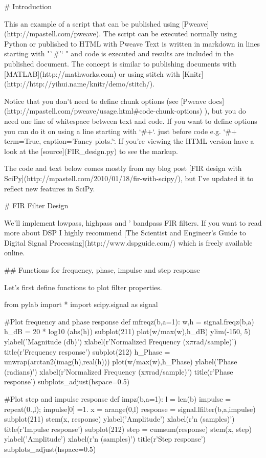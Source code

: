 
# Introduction

This an example of a script that can be published using
[Pweave](http://mpastell.com/pweave). The script can be executed
normally using Python or published to HTML with Pweave
Text is written in markdown in lines starting with "`#'` " and code
is executed and results are included in the published document.
The concept is similar to
publishing documents with [MATLAB](http://mathworks.com) or using
stitch with [Knitr](http://http://yihui.name/knitr/demo/stitch/).

Notice that you don't need to define chunk options (see
[Pweave docs](http://mpastell.com/pweave/usage.html#code-chunk-options)
),
but you do need one line of whitespace between text and code.
If you want to define options you can do it on using a line starting with
`#+`. just before code e.g. `#+ term=True, caption='Fancy plots.'`. 
If you're viewing the HTML version have a look at the
[source](FIR_design.py) to see the markup.

The code and text below comes mostly
from my blog post [FIR design with SciPy](http://mpastell.com/2010/01/18/fir-with-scipy/),
but I've updated it to reflect new features in SciPy. 

# FIR Filter Design

We'll implement lowpass, highpass and ' bandpass FIR filters. If
you want to read more about DSP I highly recommend [The Scientist
and Engineer's Guide to Digital Signal
Processing](http://www.dspguide.com/) which is freely available
online.

## Functions for frequency, phase, impulse and step response

Let's first define functions to plot filter
properties.


\begin{pweavecode}
from pylab import *
import scipy.signal as signal
    
#Plot frequency and phase response
def mfreqz(b,a=1):
    w,h = signal.freqz(b,a)
    h_dB = 20 * log10 (abs(h))
    subplot(211)
    plot(w/max(w),h_dB)
    ylim(-150, 5)
    ylabel('Magnitude (db)')
    xlabel(r'Normalized Frequency (x$\pi$rad/sample)')
    title(r'Frequency response')
    subplot(212)
    h_Phase = unwrap(arctan2(imag(h),real(h)))
    plot(w/max(w),h_Phase)
    ylabel('Phase (radians)')
    xlabel(r'Normalized Frequency (x$\pi$rad/sample)')
    title(r'Phase response')
    subplots_adjust(hspace=0.5)

#Plot step and impulse response
def impz(b,a=1):
    l = len(b)
    impulse = repeat(0.,l); impulse[0] =1.
    x = arange(0,l)
    response = signal.lfilter(b,a,impulse)
    subplot(211)
    stem(x, response)
    ylabel('Amplitude')
    xlabel(r'n (samples)')
    title(r'Impulse response')
    subplot(212)
    step = cumsum(response)
    stem(x, step)
    ylabel('Amplitude')
    xlabel(r'n (samples)')
    title(r'Step response')
    subplots_adjust(hspace=0.5)
\end{pweavecode}


